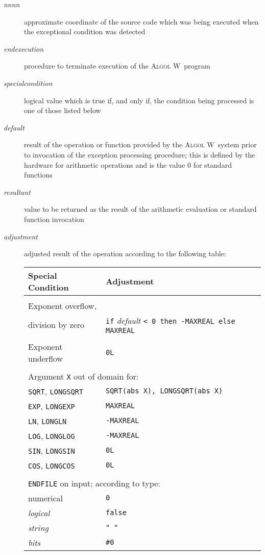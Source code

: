 \documentclass[a4paper]{article}
\def\ALGOLW{\textsc{Algol W}}
\def\A{\lstinline[language=AlgolW,style=ReferenceManual]}
\def\T#1{\textit{#1}}
\def\Transcendent#1{\textrm{\textit{\small #1}}}
\begin{document}
\begin{description}
\item[\Transcendent{nnnn}] approximate coordinate of the source code
  which was being executed when the exceptional condition was detected
\item[\Transcendent{endexecution}] procedure to terminate execution of
  the \ALGOLW\ program
\item[\Transcendent{specialcondition}] logical value which is true if,
  and only if, the condition being processed is one of those listed below
\item[\Transcendent{default}] result of the operation or function
  provided by the \ALGOLW\ system prior to invocation of the exception
  processing procedure; this is defined by the hardware for arithmetic
  operations and is the value 0 for standard functions
\item[\Transcendent{resultant}] value to be returned as the result of
  the arithmetic evaluation or standard function invocation
\item[\Transcendent{adjustment}] adjusted result of the operation
  according to the following table:

  \begin{tabular}{l|l}
    \textbf{Special Condition}     &  \textbf{Adjustment} \\
    \hline
    &\\
    Exponent overflow,     &  \\
    division by zero       &  \A!if! \Transcendent{default} \A!< 0 then -MAXREAL else MAXREAL! \\
    &\\
    Exponent underflow     &  \A!0L! \\
    &\\
    \multicolumn{2}{l}{Argument \A!X! out of domain for:} \\
    \A!SQRT!, \A!LONGSQRT! &  \A!SQRT(abs X), LONGSQRT(abs X)! \\
    \A!EXP!,  \A!LONGEXP!  &  \A!MAXREAL! \\
    \A!LN!,  \A!LONGLN!    &  \A!-MAXREAL! \\
    \A!LOG!, \A!LONGLOG!   &  \A!-MAXREAL! \\
    \A!SIN!, \A!LONGSIN!   &  \A!0L! \\
    \A!COS!, \A!LONGCOS!   &  \A!0L! \\
    &\\
    \multicolumn{2}{l}{\A!ENDFILE! on input; according to type:} \\
    numerical              &  \A!0! \\
    \T{logical}            &  \A!false! \\
    \T{string}             &  \A!" "! \\
    \T{bits}               &  \A!#0!
  \end{tabular}
\end{description}
\end{document}
